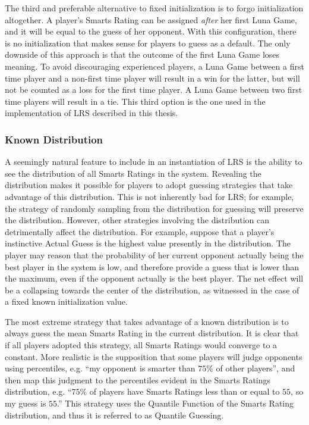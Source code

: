 The third and preferable alternative to fixed initialization is to forgo initialization altogether. A player's Smarts Rating can be assigned \textit{after} her first Luna Game, and it will be equal to the guess of her opponent. With this configuration, there is no initialization that makes sense for players to guess as a default. The only downside of this approach is that the outcome of the first Luna Game loses meaning. To avoid discouraging experienced players, a Luna Game between a first time player and a non-first time player will result in a win for the latter, but will not be counted as a loss for the first time player. A Luna Game between two first time players will result in a tie. This third option is the one used in the implementation of LRS described in this thesis.

\subsubsection{Known Distribution}

A seemingly natural feature to include in an instantiation of LRS is the ability to see the distribution of all Smarts Ratings in the system. Revealing the distribution makes it possible for players to adopt guessing strategies that take advantage of this distribution. This is not inherently bad for LRS; for example, the strategy of randomly sampling from the distribution for guessing will preserve the distribution. However, other strategies involving the distribution can detrimentally affect the distribution. For example, suppose that a player's instinctive Actual Guess is the highest value presently in the distribution. The player may reason that the probability of her current opponent actually being the best player in the system is low, and therefore provide a guess that is lower than the maximum, even if the opponent actually is the best player. The net effect will be a collapsing towards the center of the distribution, as witnessed in the case of a fixed known initialization value.

The most extreme strategy that takes advantage of a known distribution is to always guess the mean Smarts Rating in the current distribution. It is clear that if all players adopted this strategy, all Smarts Ratings would converge to a constant. More realistic is the supposition that some players will judge opponents using percentiles, e.g. ``my opponent is smarter than $75$\% of other players'', and then map this judgment to the percentiles evident in the Smarts Ratings distribution, e.g. ``$75$\% of players have Smarts Ratings less than or equal to $55$, so my guess is $55$.'' This strategy uses the Quantile Function of the Smarts Rating distribution, and thus it is referred to as Quantile Guessing.

